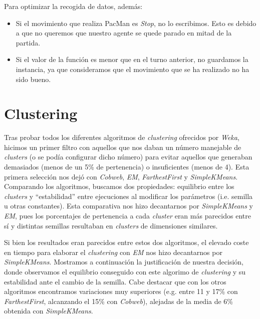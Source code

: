 \documentclass[12pt]{article}
\begin{document}
\noindent Para optimizar la recogida de datos, además:
\begin{itemize}
    \item Si el movimiento que realiza PacMan es \textit{Stop}, no lo escribimos. Esto es debido a que no queremos que nuestro agente se quede parado en mitad de la partida.
    \item Si el valor de la función es menor que en el turno anterior, no guardamos la instancia, ya que consideramos que el movimiento que se ha realizado no ha sido bueno.
\end{itemize}

\newpage
\section{Clustering}


Tras probar todos los diferentes algoritmos de \textit{clustering} ofrecidos por \textit{Weka}, hicimos un primer filtro con aquellos que nos daban un número manejable de \textit{clusters} (o se podía configurar dicho número) para evitar aquellos que generaban demasiados (menos de un 5\% de pertenencia) o insuficientes (menos de 4). Esta primera selección nos dejó con \textit{Cobweb}, \textit{EM}, \textit{FarthestFirst} y \textit{SimpleKMeans}. Comparando los algoritmos, buscamos dos propiedades: equilibrio entre los \textit{clusters} y ``estabilidad'' entre ejecuciones al modificar los parámetros (i.e. semilla u otras constantes). Esta comparativa nos hizo decantarnos por \textit{SimpleKMeans} y \textit{EM}, pues los porcentajes de pertenencia a cada \textit{cluster} eran más parecidos entre sí y distintas semillas resultaban en \textit{clusters} de dimensiones similares.

Si bien los resultados eran parecidos entre estos dos algoritmos, el elevado coste en tiempo para elaborar el \textit{clustering} con \textit{EM} nos hizo decantarnos por \textit{SimpleKMeans}. Mostramos a continuación la justificación de nuestra decisión, donde observamos el equilibrio conseguido con este algorimo de \textit{clustering} y su estabilidad ante el cambio de la semilla. Cabe destacar que con los otros algoritmos encontramos variaciones muy superiores (e.g. entre 11 y 17\% con \textit{FarthestFirst}, alcanzando el 15\% con \textit{Cobweb}), alejadas de la media de 6\% obtenida con \textit{SimpleKMeans}.
\end{document}
